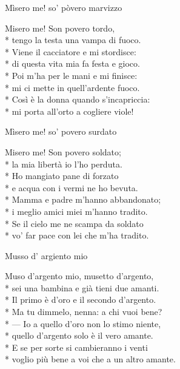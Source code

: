 \documentclass[11pt]{book}
\begin{document}
\begin{poem}{Mìsero me! so’ pòvero marvizzo}{}
\settowidth{\versewidth}{Così è la donna quando s’incapriccia}
\begin{altverse}
Misero me! Son povero tordo,\\*
tengo la testa una vampa di fuoco.\\*
Viene il cacciatore e mi stordisce:\\*
di questa vita mia fa festa e gioco.\\*
Poi m’ha per le mani e mi finisce:\\*
mi ci mette in quell’ardente fuoco.\\*
Così è la donna quando s’incapriccia:\\*
mi porta all’orto a cogliere viole!
\end{altverse}
\end{poem}

\begin{poem}{Mìsero me! so’ povero surdato}{}
\settowidth{\versewidth}{Vo’ far pace con lei che m’ha tradito}
\begin{altverse}
Misero me! Son povero soldato;\\*
la mia libertà io l'ho perduta.\\*
Ho mangiato pane di forzato\\*
e acqua con i vermi ne ho bevuta.\\*
Mamma e padre m’hanno abbandonato;\\*
i meglio amici miei m’hanno tradito.\\*
Se il cielo me ne scampa da soldato\\*
vo’ far pace con lei che m’ha tradito.
\end{altverse}
\end{poem}

\begin{poem}{Musso d’ argiento mio}{}
\settowidth{\versewidth}{Voglio più bene a voi che a un altro amante}
\begin{altverse}
Muso d’argento mio, musetto d’argento,\\*
sei una bambina e già tieni due amanti.\\*
Il primo è d’oro e il secondo d’argento.\\*
Ma tu dimmelo, nenna: a chi vuoi bene?\\*
— Io a quello d’oro non lo stimo niente,\\*
quello d’argento solo è il vero amante.\\*
E se per sorte si cambieranno i venti\\*
voglio più bene a voi che a un altro amante.
\end{altverse}
\end{poem}
\end{document}
